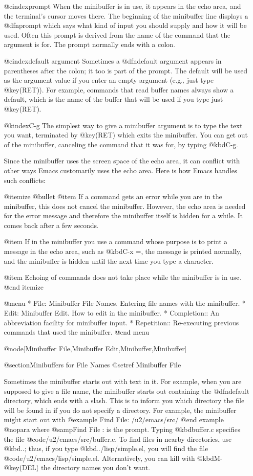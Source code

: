 {{{{@cindex{prompt}
  When the minibuffer is in use, it appears in the echo area, and the
terminal's cursor moves there.  The beginning of the minibuffer line
displays a @dfn{prompt} which says what kind of input you should supply and
how it will be used.  Often this prompt is derived from the name of the
command that the argument is for.  The prompt normally ends with a colon.

@cindex{default argument}
  Sometimes a @dfn{default argument} appears in parentheses after the
colon; it too is part of the prompt.  The default will be used as the
argument value if you enter an empty argument (e.g., just type
@key(RET)).  For example, commands that read buffer names always show
a default, which is the name of the buffer that will be used if you type
just @key(RET).

@kindex{C-g}
  The simplest way to give a minibuffer argument is to type the text you
want, terminated by @key(RET) which exits the minibuffer.  You can
get out of the minibuffer, canceling the command that it was for, by
typing @kbd{C-g}.

  Since the minibuffer uses the screen space of the echo area, it can
conflict with other ways Emacs customarily uses the echo area.  Here is
how Emacs handles such conflicts:

@itemize @bullet
@item
If a command gets an error while you are in the minibuffer, this does
not cancel the minibuffer.  However, the echo area is needed for the
error message and therefore the minibuffer itself is hidden for a while.
It comes back after a few seconds.

@item
If in the minibuffer you use a command whose purpose is to print a
message in the echo area, such as @kbd{C-x =}, the message is printed
normally, and the minibuffer is hidden until the next time you type
a character.

@item
Echoing of commands does not take place while the minibuffer is in use.
@end itemize

@menu
* File: Minibuffer File Names.  Entering file names with the minibuffer.
* Edit: Minibuffer Edit.	How to edit in the minibuffer.
* Completion::		An abbreviation facility for minibuffer input.
* Repetition::		Re-executing previous commands that used the minibuffer.
@end menu

@node[Minibuffer File,Minibuffer Edit,Minibuffer,Minibuffer]

@section{Minibuffers for File Names}
@setref Minibuffer File

  Sometimes the minibuffer starts out with text in it.  For example, when
you are supposed to give a file name, the minibuffer starts out containing
the @dfn{default directory}, which ends with a slash.  This is to inform
you which directory the file will be found in if you do not specify a
directory.  For example, the minibuffer might start out with
@example
Find File: /u2/emacs/src/
@end example
@nopara
where @samp{Find File: } is the prompt.  Typing @kbd{buffer.c}
specifies the file @code{/u2/emacs/src/buffer.c}.  To find files in nearby
directories, use @kbd{..}; thus, if you type @kbd{../lisp/simple.el}, you
will find the file @code{/u2/emacs/lisp/simple.el}.  Alternatively,
you can kill with @kbd{M-@key(DEL)} the directory names you don't want.

}}}}
